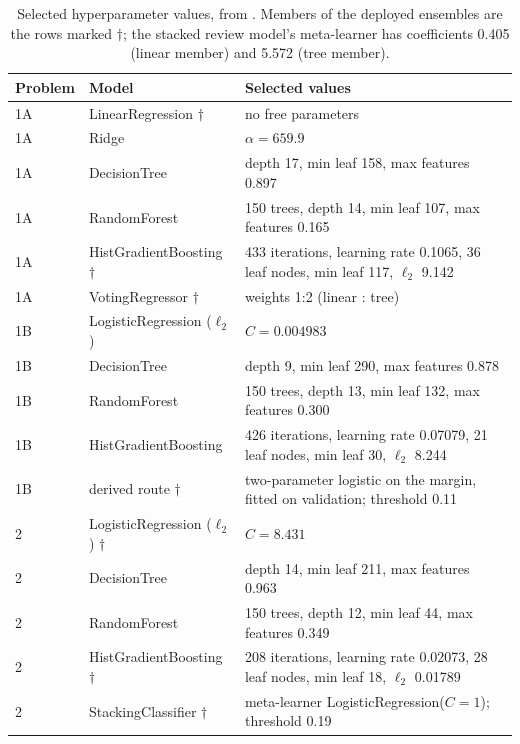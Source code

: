 \begin{table}[htbp]
\centering
\caption{Selected hyperparameter values, from
. Members of the deployed ensembles are
the rows marked $\dagger$; the stacked review model's meta-learner has
coefficients 0.405 (linear member) and 5.572 (tree member).}
\label{tab:selected}
\footnotesize
\setlength{\tabcolsep}{4pt}
\begin{tabular}{@{}llp{9.6cm}@{}}
\toprule
\textbf{Problem} & \textbf{Model} & \textbf{Selected values} \\
\midrule
1A & LinearRegression $\dagger$ & no free parameters \\
1A & Ridge & $\alpha = 659.9$ \\
1A & DecisionTree & depth 17, min leaf 158, max features 0.897 \\
1A & RandomForest & 150 trees, depth 14, min leaf 107, max features 0.165 \\
1A & HistGradientBoosting $\dagger$ & 433 iterations, learning rate 0.1065, 36 leaf nodes, min leaf 117, $\ell_2$ 9.142 \\
1A & VotingRegressor $\dagger$ & weights 1:2 (linear : tree) \\
\midrule
1B & LogisticRegression ($\ell_2$) & $C = 0.004983$ \\
1B & DecisionTree & depth 9, min leaf 290, max features 0.878 \\
1B & RandomForest & 150 trees, depth 13, min leaf 132, max features 0.300 \\
1B & HistGradientBoosting & 426 iterations, learning rate 0.07079, 21 leaf nodes, min leaf 30, $\ell_2$ 8.244 \\
1B & derived route $\dagger$ & two-parameter logistic on the margin, fitted on validation; threshold 0.11 \\
\midrule
2 & LogisticRegression ($\ell_2$) $\dagger$ & $C = 8.431$ \\
2 & DecisionTree & depth 14, min leaf 211, max features 0.963 \\
2 & RandomForest & 150 trees, depth 12, min leaf 44, max features 0.349 \\
2 & HistGradientBoosting $\dagger$ & 208 iterations, learning rate 0.02073, 28 leaf nodes, min leaf 18, $\ell_2$ 0.01789 \\
2 & StackingClassifier $\dagger$ & meta-learner LogisticRegression($C = 1$); threshold 0.19 \\
\bottomrule
\end{tabular}
\end{table}

